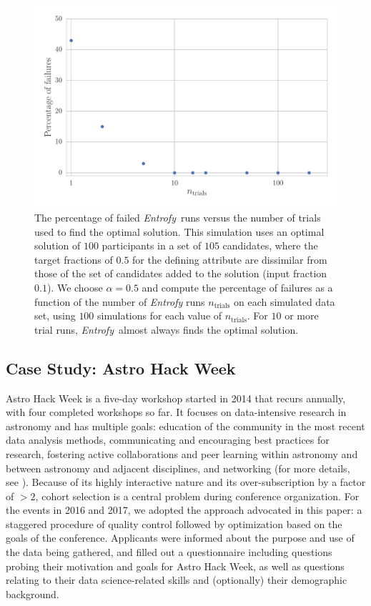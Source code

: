 \documentclass[10pt,letterpaper]{article}
\newcommand{\project}[1]{\textsl{#1}}
\newcommand{\entrofy}{\project{Entrofy}}
\begin{document}
\begin{figure}[htbp]
\begin{center}
\includegraphics[width=5in]{f2.pdf}
\caption{The percentage of failed \entrofy\ runs versus the number of 
trials used to find the optimal solution. This simulation uses an optimal solution of $100$ participants in a set of $105$ candidates, where the target fractions of $0.5$ for the defining attribute are dissimilar from those of the set of candidates added to the solution (input fraction $0.1$). We choose $\alpha = 0.5$ and compute the percentage of failures as a function of the number of \textit{Entrofy} runs $n_\mathrm{trials}$ on each simulated data set, using $100$ simulations for each value of $n_\mathrm{trials}$.
For $10$ or more trial runs, \entrofy\ almost always finds the optimal solution.}
\label{fig:experiments2}
\end{center}
\end{figure}


\subsection*{Case Study: Astro Hack Week}
\label{sec:casestudy}

Astro Hack Week is a five-day workshop started in 2014 that recurs annually, with four completed workshops so far. It focuses on data-intensive research in astronomy and has multiple goals: education of the community in the most recent data analysis methods, communicating and encouraging best practices for research, fostering active collaborations and peer learning within astronomy and between astronomy and adjacent disciplines, and networking (for more details, see \citealt{hackweekpaper}). Because of its highly interactive nature and its over-subscription by a factor of $>2$, cohort selection is a central problem during conference organization. For the events in 2016 and 2017, we adopted the approach advocated in this paper: a staggered procedure of quality control followed by optimization based on the goals of the conference. Applicants were informed about the purpose and use of the data being gathered, and filled out a questionnaire including questions probing their motivation and goals for Astro Hack Week, as well as questions relating to their data science-related skills and (optionally) their demographic background.
\end{document}

